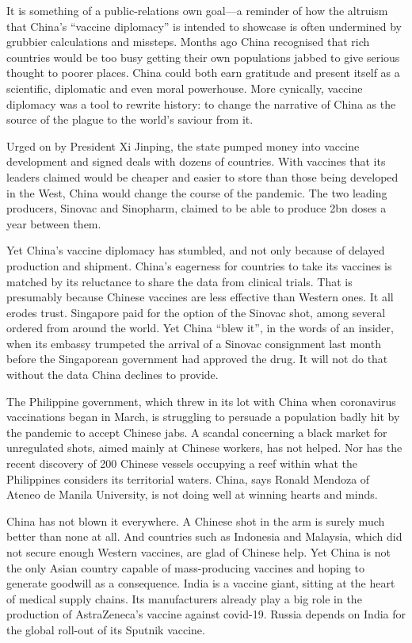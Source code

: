 \documentclass{article}
\begin{document}
It is something of a public-relations own goal---a reminder of how the altruism that China's ``vaccine diplomacy'' is intended to showcase is often undermined by grubbier calculations and missteps. Months ago China recognised that rich countries would be too busy getting their own populations jabbed to give serious thought to poorer places. China could both earn gratitude and present itself as a scientific, diplomatic and even moral powerhouse. More cynically, vaccine diplomacy was a tool to rewrite history: to change the narrative of China as the source of the plague to the world's saviour from it. 

Urged on by President Xi Jinping, the state pumped money into vaccine development and signed deals with dozens of countries. With vaccines that its leaders claimed would be cheaper and easier to store than those being developed in the West, China would change the course of the pandemic. The two leading producers, Sinovac and Sinopharm, claimed to be able to produce 2bn doses a year between them. 

Yet China's vaccine diplomacy has stumbled, and not only because of delayed production and shipment. China's eagerness for countries to take its vaccines is matched by its reluctance to share the data from clinical trials. That is presumably because Chinese vaccines are less effective than Western ones. It all erodes trust. Singapore paid for the option of the Sinovac shot, among several ordered from around the world. Yet China ``blew it'', in the words of an insider, when its embassy trumpeted the arrival of a Sinovac consignment last month before the Singaporean government had approved the drug. It will not do that without the data China declines to provide. 

The Philippine government, which threw in its lot with China when coronavirus vaccinations began in March, is struggling to persuade a population badly hit by the pandemic to accept Chinese jabs. A scandal concerning a black market for unregulated shots, aimed mainly at Chinese workers, has not helped. Nor has the recent discovery of 200 Chinese vessels occupying a reef within what the Philippines considers its territorial waters. China, says Ronald Mendoza of Ateneo de Manila University, is not doing well at winning hearts and minds. 

China has not blown it everywhere. A Chinese shot in the arm is surely much better than none at all. And countries such as Indonesia and Malaysia, which did not secure enough Western vaccines, are glad of Chinese help. Yet China is not the only Asian country capable of mass-producing vaccines and hoping to generate goodwill as a consequence. India is a vaccine giant, sitting at the heart of medical supply chains. Its manufacturers already play a big role in the production of AstraZeneca's vaccine against covid-19. Russia depends on India for the global roll-out of its Sputnik vaccine. 
\end{document}
